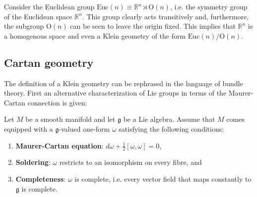     \begin{example}
        Consider the Euclidean group $\text{Euc}(n)\equiv\mathbb{R}^n\rtimes\text{O}(n)$, i.e. the symmetry group of the Euclidean space $\mathbb{R}^n$. This group clearly acts transitively and, furthermore, the subgroup $\text{O}(n)$ can be seen to leave the origin fixed. This implies that $\mathbb{R}^n$ is a homogenous space and even a Klein geometry of the form $\text{Euc}(n)/\text{O}(n)$.
    \end{example}


\subsection{Cartan geometry}

    The definition of a Klein geometry can be rephrased in the language of bundle theory. First an alternative characterization of Lie groups in terms of the Maurer-Cartan connection is given:
    \begin{property}
        Let $M$ be a smooth manifold and let $\mathfrak{g}$ be a Lie algebra. Assume that $M$ comes equipped with a $\mathfrak{g}$-valued one-form $\omega$ satisfying the following conditions:
        \begin{enumerate}
            \item \textbf{Maurer-Cartan equation}: $d\omega + \frac{1}{2}[\omega,\omega]=0$,
            \item \textbf{Soldering}: $\omega$ restricts to an isomorphism on every fibre, and
            \item \textbf{Completeness}: $\omega$ is complete, i.e. every vector field that maps constantly to $\mathfrak{g}$ is complete.
        \end{enumerate}
    \end{property}


